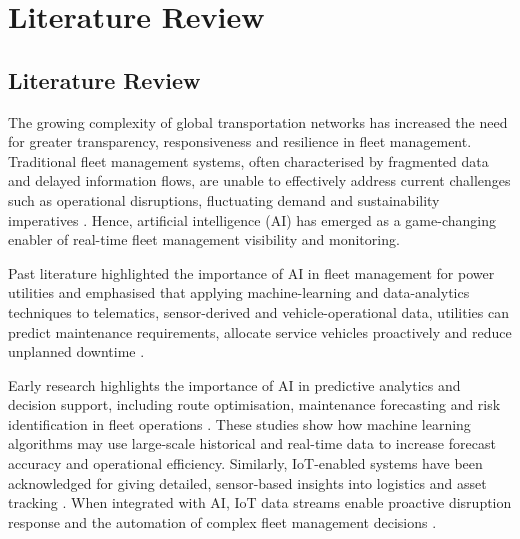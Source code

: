 

\maketitle

\chapter{Literature Review}
\section{Literature Review}

The growing complexity of global transportation networks has increased the need for greater transparency, responsiveness and resilience in fleet management. Traditional fleet management systems, often characterised by fragmented data and delayed information flows, are unable to effectively address current challenges such as operational disruptions, fluctuating demand and sustainability imperatives \cite{Ivanov2020, Queiroz2022}. Hence, artificial intelligence (AI) has emerged as a game-changing enabler of real-time fleet management visibility and monitoring.

Past literature highlighted the importance of AI in fleet management for power utilities and emphasised that applying machine-learning and data-analytics techniques to telematics, sensor-derived and vehicle-operational data, utilities can predict maintenance requirements, allocate service vehicles proactively and reduce unplanned downtime \cite{Mohamed2025}.

Early research highlights the importance of AI in predictive analytics and decision support, including route optimisation, maintenance forecasting and risk identification in fleet operations \cite{Choi2018, Min2019}. These studies show how machine learning algorithms may use large-scale historical and real-time data to increase forecast accuracy and operational efficiency. Similarly, IoT-enabled systems have been acknowledged for giving detailed, sensor-based insights into logistics and asset tracking \cite{BenDaya2019}. When integrated with AI, IoT data streams enable proactive disruption response and the automation of complex fleet management decisions \cite{Tiwari2018}.

